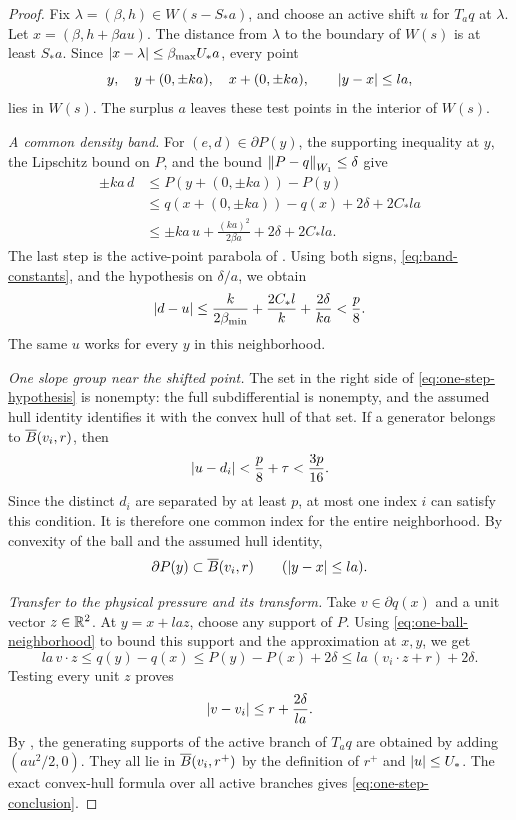 \begin{proof}
Fix \(\lambda=(\beta,h)\in W(s-S_*a)\), and choose an active
shift \(u\) for \(T_aq\) at \(\lambda\).
Let \(x=(\beta,h+\beta au)\).
The distance from \(\lambda\) to the boundary of \(W(s)\) is at least
\(S_*a\).
Since \(\left|x-\lambda\right|\le\beta_{\max}U_*a\), every point
\[
 y,\quad y+(0,\pm ka),\quad x+(0,\pm ka),
 \qquad \left|y-x\right|\le la,
\]
lies in \(W(s)\).
The surplus \(a\) leaves these test points in the interior of \(W(s)\).

\emph{A common density band.}
For \((e,d)\in\partial P(y)\), the supporting inequality at \(y\),
the Lipschitz bound on \(P\), and
the bound \(\left\lVert P-q\right\rVert_{W_1}\le\delta\) give
\begin{align*}
 \pm ka\,d
 &\le P(y+(0,\pm ka))-P(y)\\
 &\le q(x+(0,\pm ka))-q(x)
                         +2\delta+2C_*la\\
 &\le \pm ka\,u+\frac{(ka)^2}{2\beta a}
                         +2\delta+2C_*la.
\end{align*}
The last step is the active-point parabola of .
Using both signs, \eqref{eq:band-constants}, and the hypothesis on
\(\delta/a\), we obtain
\begin{equation}\label{eq:common-density-band}
 \left|d-u\right|\le
 \frac{k}{2\beta_{\min}}+\frac{2C_*l}{k}
                       +\frac{2\delta}{ka}<\frac p8.
\end{equation}
The same \(u\) works for every \(y\) in this neighborhood.

\emph{One slope group near the shifted point.}
The set in the right side of \eqref{eq:one-step-hypothesis} is nonempty:
the full subdifferential is nonempty, and the assumed hull identity
identifies it with the convex hull of that set.
If a generator belongs to \(\overline B(v_i,r)\), then
\[
 \left|u-d_i\right|<\frac p8+\tau<\frac{3p}{16}.
\]
Since the distinct \(d_i\) are separated by at least \(p\), at most one
index \(i\) can satisfy this condition.
It is therefore one common index for the entire neighborhood.
By convexity of the ball and the assumed hull identity,
\begin{equation}\label{eq:one-ball-neighborhood}
 \partial P(y)\subset\overline B(v_i,r)
 \qquad(\left|y-x\right|\le la).
\end{equation}

\emph{Transfer to the physical pressure and its transform.}
Take \(v\in\partial q(x)\) and a unit vector \(z\in\mathbb R^2\).
At \(y=x+la z\), choose any support of \(P\).
Using \eqref{eq:one-ball-neighborhood} to bound this support and
the approximation at \(x,y\), we get
\[
 la\,v\cdot z
 \le q(y)-q(x)
 \le P(y)-P(x)+2\delta
 \le la\,(v_i\cdot z+r)+2\delta.
\]
Testing every unit \(z\) proves
\[
 \left|v-v_i\right|\le r+\frac{2\delta}{la}.
\]
By , the generating supports of the active branch
of \(T_aq\) are obtained by adding \((au^2/2,0)\).
They all lie in \(\overline B(v_i,r^+)\) by
the definition of \(r^+\) and \(\left|u\right|\le U_*\).
The exact convex-hull formula over all active branches gives
\eqref{eq:one-step-conclusion}.
\end{proof}

